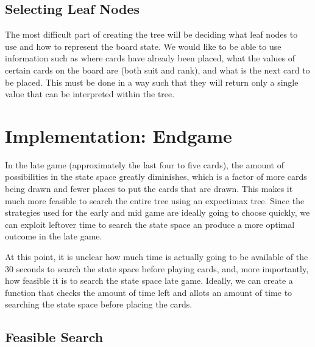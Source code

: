 \documentclass[twoside]{article}
\begin{document}
\begin{multicols}{2}
\subsection{Selecting Leaf Nodes}
The most difficult part of creating the tree will be deciding what leaf nodes to use and how to represent the board state. We would like to be able to use information such as where cards have already been placed, what the values of certain cards on the board are (both suit and rank), and what is the next card to be placed. This must be done in a way such that they will return only a single value that can be interpreted within the tree.


\section{Implementation: Endgame}

In the late game (approximately the last four to five cards), the amount of possibilities in the state space greatly diminishes, which is a factor of more cards being drawn and fewer places to put the cards that are drawn. This makes it much more feasible to search the entire tree using an expectimax tree. Since the strategies used for the early and mid game are ideally going to choose quickly, we can exploit leftover time to search the state space an produce a more optimal outcome in the late game.

At this point, it is unclear how much time is actually going to be available of the 30 seconds to search the state space before playing cards, and, more importantly, how feasible it is to search the state space late game. Ideally, we can create a function that checks the amount of time left and allots an amount of time to searching the state space before placing the cards.

\subsection{Feasible Search}



\begin{thebibliography}{99} %


\end{thebibliography}


\end{multicols}
\end{document}
